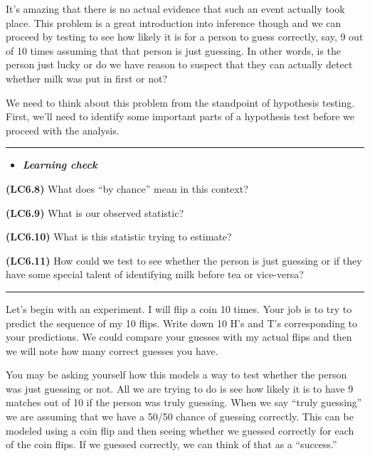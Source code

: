 \documentclass[]{tufte-book}
\let\oldrule=\rule
\renewcommand{\rule}[1]{\oldrule{\linewidth}}
\newenvironment{rmdblock}[1]
  {\begin{shaded*}
  \begin{itemize}
  \renewcommand{\labelitemi}{
    \raisebox{-.7\height}[0pt][0pt]{
    }
  }
  \item
  }
  {
  \end{itemize}
  \end{shaded*}
  }
\newenvironment{learncheck}
  {\begin{rmdblock}{warning}}
  {\end{rmdblock}}
\begin{document}
It's amazing that there is no actual evidence that such an event
actually took place. This problem is a great introduction into inference
though and we can proceed by testing to see how likely it is for a
person to guess correctly, say, 9 out of 10 times assuming that that
person is just guessing. In other words, is the person just lucky or do
we have reason to suspect that they can actually detect whether milk was
put in first or not?

We need to think about this problem from the standpoint of hypothesis
testing. First, we'll need to identify some important parts of a
hypothesis test before we proceed with the analysis.

\begin{center}\rule{0.5\linewidth}{\linethickness}\end{center}

\begin{learncheck}
\textbf{\emph{Learning check}}
\end{learncheck}

\textbf{(LC6.8)} What does ``by chance'' mean in this context?

\textbf{(LC6.9)} What is our observed statistic?

\textbf{(LC6.10)} What is this statistic trying to estimate?

\textbf{(LC6.11)} How could we test to see whether the person is just
guessing or if they have some special talent of identifying milk before
tea or vice-versa?

\begin{center}\rule{0.5\linewidth}{\linethickness}\end{center}

Let's begin with an experiment. I will flip a coin 10 times. Your job is
to try to predict the sequence of my 10 flips. Write down 10 H's and T's
corresponding to your predictions. We could compare your guesses with my
actual flips and then we will note how many correct guesses you have.

You may be asking yourself how this models a way to test whether the
person was just guessing or not. All we are trying to do is see how
likely it is to have 9 matches out of 10 if the person was truly
guessing. When we say ``truly guessing'' we are assuming that we have a
50/50 chance of guessing correctly. This can be modeled using a coin
flip and then seeing whether we guessed correctly for each of the coin
flips. If we guessed correctly, we can think of that as a ``success.''
\end{document}
